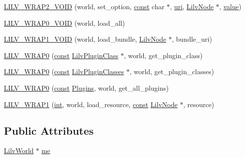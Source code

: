 \begin{DoxyCompactItemize}
\item 
\hyperlink{struct_lilv_1_1_world_af85f4c45fb492703a49bd1277c88e913}{L\+I\+L\+V\+\_\+\+W\+R\+A\+P2\+\_\+\+V\+O\+ID} (world, set\+\_\+option, \hyperlink{getopt1_8c_a2c212835823e3c54a8ab6d95c652660e}{const} char $\ast$, \hyperlink{lib_2expat_8h_a5a9fdd6c2606370ad12f24c078ac6585}{uri}, \hyperlink{lilv_8h_ae183dca3dca5368d34dbd863a405437b}{Lilv\+Node} $\ast$, \hyperlink{lib_2expat_8h_a4a30a13b813682e68c5b689b45c65971}{value})
\item 
\hyperlink{struct_lilv_1_1_world_ac37132a3cd74d2efb09c0ebe9975b6ce}{L\+I\+L\+V\+\_\+\+W\+R\+A\+P0\+\_\+\+V\+O\+ID} (world, load\+\_\+all)
\item 
\hyperlink{struct_lilv_1_1_world_a19707b7d1a37d4d6f687aafad1d15286}{L\+I\+L\+V\+\_\+\+W\+R\+A\+P1\+\_\+\+V\+O\+ID} (world, load\+\_\+bundle, \hyperlink{lilv_8h_ae183dca3dca5368d34dbd863a405437b}{Lilv\+Node} $\ast$, bundle\+\_\+uri)
\item 
\hyperlink{struct_lilv_1_1_world_a2b62ad9a4e48658cf5900599d65eb9fc}{L\+I\+L\+V\+\_\+\+W\+R\+A\+P0} (\hyperlink{getopt1_8c_a2c212835823e3c54a8ab6d95c652660e}{const} \hyperlink{lilv_8h_a94da06d43a4f980af280b9d8bf4ae1f0}{Lilv\+Plugin\+Class} $\ast$, world, get\+\_\+plugin\+\_\+class)
\item 
\hyperlink{struct_lilv_1_1_world_a1bd09b2e10f0467ce35e2813339546ff}{L\+I\+L\+V\+\_\+\+W\+R\+A\+P0} (\hyperlink{getopt1_8c_a2c212835823e3c54a8ab6d95c652660e}{const} \hyperlink{lilv_8h_a1ef5389c0a24cb8e0adcf971d2d12f0e}{Lilv\+Plugin\+Classes} $\ast$, world, get\+\_\+plugin\+\_\+classes)
\item 
\hyperlink{struct_lilv_1_1_world_ad8e738f6f14c31d69f7e1ccf4176e79e}{L\+I\+L\+V\+\_\+\+W\+R\+A\+P0} (\hyperlink{getopt1_8c_a2c212835823e3c54a8ab6d95c652660e}{const} \hyperlink{struct_lilv_1_1_plugins}{Plugins}, world, get\+\_\+all\+\_\+plugins)
\item 
\hyperlink{struct_lilv_1_1_world_a1897f1af33baede6228422f0252b5cd6}{L\+I\+L\+V\+\_\+\+W\+R\+A\+P1} (\hyperlink{xmltok_8h_a5a0d4a5641ce434f1d23533f2b2e6653}{int}, world, load\+\_\+resource, \hyperlink{getopt1_8c_a2c212835823e3c54a8ab6d95c652660e}{const} \hyperlink{lilv_8h_ae183dca3dca5368d34dbd863a405437b}{Lilv\+Node} $\ast$, resource)
\end{DoxyCompactItemize}
\subsection*{Public Attributes}
\begin{DoxyCompactItemize}
\item 
\hyperlink{lilv_8h_a91c1745aa6ffca2b6b87c56df6c5ab86}{Lilv\+World} $\ast$ \hyperlink{struct_lilv_1_1_world_a3a9b29f08e1dc76539142e90e3d29f81}{me}
\end{DoxyCompactItemize}


